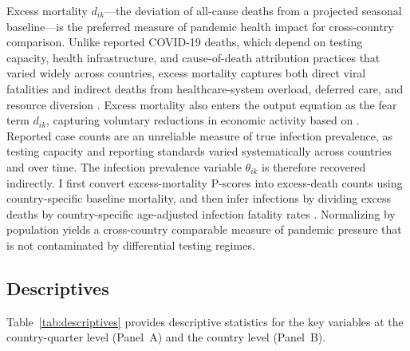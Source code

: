 \documentclass[12pt, a4paper]{article}
\begin{document}
\noindent Excess mortality \(d_{ik}\)---the deviation of all-cause deaths from a projected seasonal baseline---is the preferred measure of pandemic health impact for cross-country comparison. Unlike reported COVID-19 deaths, which depend on testing capacity, health infrastructure, and cause-of-death attribution practices that varied widely across countries, excess mortality captures both direct viral fatalities and indirect deaths from healthcare-system overload, deferred care, and resource diversion \citep{Msemburi2023WHO}. Excess mortality also enters the output equation as the fear term \(d_{ik}\), capturing voluntary reductions in economic activity based on \citet{GOOLSBEE2021}. Reported case counts are an unreliable measure of true infection prevalence, as testing capacity and reporting standards varied systematically across countries and over time. The infection prevalence variable \(\theta_{ik}\) is therefore recovered indirectly. I first convert excess-mortality P-scores into excess-death counts using country-specific baseline mortality, and then infer infections by dividing excess deaths by country-specific age-adjusted infection fatality rates \citep{Levin2020}. Normalizing by population yields a cross-country comparable measure of pandemic pressure that is not contaminated by differential testing regimes.


\subsection{Descriptives}

Table~\ref{tab:descriptives} provides descriptive statistics for the key variables at the country-quarter level (Panel~A) and the country level (Panel~B). 
\end{document}
